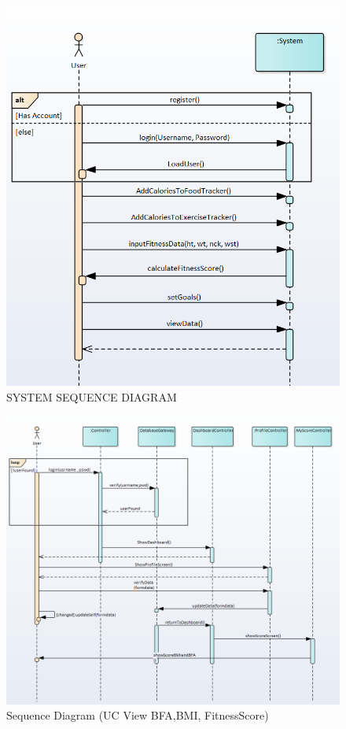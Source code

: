 \documentclass[10pt]{article}
\begin{document}
\begin{figure}[p!]
	\begin{center}
		\includegraphics[width=\columnwidth]{SSD.png}
		\caption{{SYSTEM SEQUENCE DIAGRAM
				{\label{div-941985}}%
		}}
	\end{center}
\end{figure}



\begin{figure}[h!]
	\begin{center}
		\includegraphics[width=\columnwidth]{UC1.png}
		\caption{{Sequence Diagram (UC View BFA,BMI, FitnessScore)
				{\label{div-391931}}%
		}}
	\end{center}
\end{figure}
\end{document}
